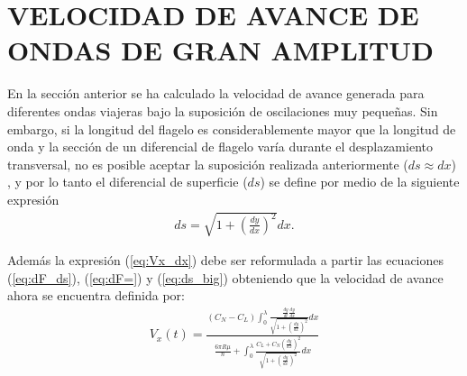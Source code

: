 \section{VELOCIDAD DE AVANCE DE ONDAS DE GRAN AMPLITUD} \label{sec:velocidad_grande}
En la sección anterior se ha calculado la velocidad de avance generada para diferentes ondas viajeras bajo la suposición de oscilaciones muy pequeñas. Sin embargo, si la longitud del flagelo es considerablemente mayor que la longitud de onda y la sección de un diferencial de flagelo varía durante el desplazamiento transversal, no es posible aceptar la suposición realizada anteriormente ($ds \approx dx$) \cite{Gray1955}, y por lo tanto el diferencial de superficie ($ds$) se define por medio de la siguiente expresión
\begin{eqnarray}
	\label{eq:ds_big}
	ds = \sqrt{ 1 +\left(\frac{dy}{dx} \right)^2 } dx .
\end{eqnarray}

Además la expresión (\ref{eq:Vx_dx}) debe ser reformulada a partir las ecuaciones  (\ref{eq:dF_ds}), (\ref{eq:dF=}) y (\ref{eq:ds_big}) obteniendo que la velocidad de avance ahora se encuentra definida por: 
\begin{eqnarray}
\label{eq:Vx_dx}
	V_x (t) = \displaystyle  \frac{ (C_N - C_L) \displaystyle     \int_{0}^{\lambda}   \frac{ \frac{dy}{dt} \frac{dy}{dx} } { \sqrt{1 + \left( \frac{dy}{dx}\right)^2 } }  dx }
	{ \displaystyle  \frac{6 \pi R \mu}{n} +
	 \displaystyle   \int_{0}^{\lambda} {
		 \frac{C_L + C_N \left( \frac{dy}{dx} \right)^2}
	 			 { \sqrt{1 + \left( \frac{dy}{dx}\right)^2 } } } dx
	}
\end{eqnarray}

